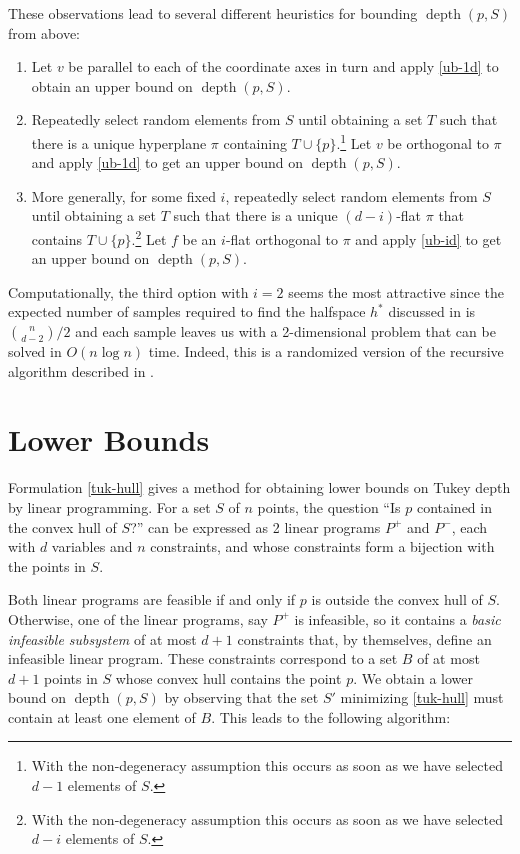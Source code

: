 \documentclass[lotsofwhite,12pt]{patmorin}
\DeclareMathOperator{\td}{depth}
\begin{document}
These observations lead to several different heuristics for bounding
$\td(p,S)$ from above:

\begin{enumerate}
\item Let $v$ be parallel to each of the coordinate axes in turn and
apply \eqref{ub-1d} to obtain an upper bound on $\td(p,S)$.

\item Repeatedly select random elements from $S$ until obtaining a set
$T$ such that there is a unique hyperplane $\pi$ containing
$T\cup\{p\}$.\footnote{With the non-degeneracy assumption this occurs
as soon as we have selected $d-1$ elements of $S$.} Let $v$ be
orthogonal to $\pi$ and apply \eqref{ub-1d} to get an upper bound on
$\td(p,S)$.

\item More generally, for some fixed $i$, repeatedly select random
elements from $S$ until obtaining a set $T$ such that there is a
unique $(d-i)$-flat $\pi$  that contains $T\cup\{p\}$.\footnote{With
the non-degeneracy assumption this occurs as soon as we have selected
$d-i$ elements of $S$.}  Let $f$ be an
$i$-flat orthogonal to $\pi$ and apply \eqref{ub-id} to get an upper
bound on $\td(p,S)$.

\end{enumerate}


Computationally, the third option with $i=2$ seems the most attractive
since the expected number of samples required to find the halfspace
$h^*$ discussed in  is ${n\choose d-2}/2$ and each
sample leaves us with a 2-dimensional problem that can be solved in
$O(n\log n)$ time.  Indeed, this is a randomized version of the
recursive algorithm described in .

\section{Lower Bounds}

Formulation \eqref{tuk-hull} gives a method for obtaining lower bounds
on Tukey depth by linear programming.  For a set $S$ of $n$ points,
the question ``Is $p$ contained in the convex hull of $S$?'' can be
expressed as 2 linear programs $P^+$ and $P^-$, each with $d$
variables and $n$ constraints, and whose constraints form a bijection
with the points in $S$.  

Both linear programs are feasible if and only if $p$ is outside the
convex hull of $S$. Otherwise, one of the linear programs, say $P^+$
is infeasible, so it contains a \emph{basic infeasible subsystem} of
at most $d+1$ constraints that, by themselves, define an infeasible
linear program.  These constraints correspond to a set $B$ of at most
$d+1$ points in $S$ whose convex hull contains the point $p$.  We
obtain a lower bound on $\td(p,S)$ by observing that the set $S'$
minimizing \eqref{tuk-hull} must contain at least one element of $B$.
This leads to the following algorithm:
\end{document}
